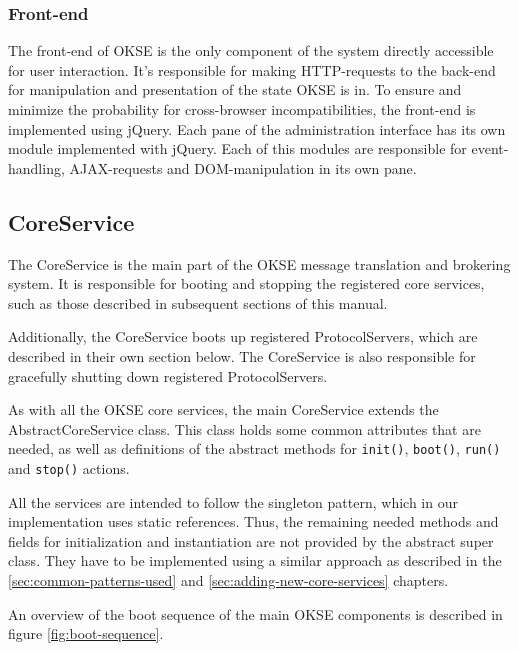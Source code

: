 \subsubsection{Front-end}

The front-end of OKSE is the only component of the system directly accessible for user interaction. It's responsible for making HTTP-requests to the back-end for manipulation and presentation of the state OKSE is in. To ensure and minimize the probability for cross-browser incompatibilities, the front-end is implemented using jQuery. Each pane of the administration interface has its own module implemented with jQuery. Each of this modules are responsible for event-handling, AJAX-requests and DOM-manipulation in its own pane.

\subsection{CoreService}

The CoreService is the main part of the OKSE message translation and brokering system. It is responsible for booting and stopping the registered core services, such as those described in subsequent sections of this manual.

Additionally, the CoreService boots up registered ProtocolServers, which are described in their own section below. The CoreService is also responsible for gracefully shutting down registered ProtocolServers.

As with all the OKSE core services, the main CoreService extends the AbstractCoreService class. This class holds some common attributes that are needed, as well as definitions of the abstract methods for \verb!init()!, \verb!boot()!, \verb!run()! and \verb!stop()! actions.

All the services are intended to follow the singleton pattern, which in our implementation uses static references. Thus, the remaining needed methods and fields for initialization and instantiation are not provided by the abstract super class. They have to be implemented using a similar approach as described in the \ref{sec:common-patterns-used} and \ref{sec:adding-new-core-services} chapters.

An overview of the boot sequence of the main OKSE components is described in figure \ref{fig:boot-sequence}.


